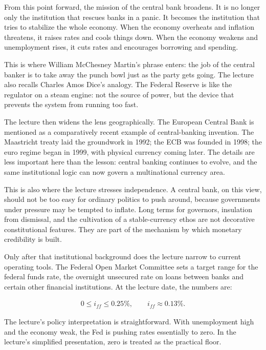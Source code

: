 From this point forward, the mission of the central bank broadens. It is no longer only the institution that rescues banks in a panic. It becomes the institution that tries to stabilize the whole economy. When the economy overheats and inflation threatens, it raises rates and cools things down. When the economy weakens and unemployment rises, it cuts rates and encourages borrowing and spending.

This is where William McChesney Martin's phrase enters: the job of the central banker is to take away the punch bowl just as the party gets going. The lecture also recalls Charles Amos Dice's analogy. The Federal Reserve is like the regulator on a steam engine: not the source of power, but the device that prevents the system from running too fast.

The lecture then widens the lens geographically. The European Central Bank is mentioned as a comparatively recent example of central-banking invention. The Maastricht treaty laid the groundwork in 1992; the ECB was founded in 1998; the euro regime began in 1999, with physical currency coming later. The details are less important here than the lesson: central banking continues to evolve, and the same institutional logic can now govern a multinational currency area.

This is also where the lecture stresses independence. A central bank, on this view, should not be too easy for ordinary politics to push around, because governments under pressure may be tempted to inflate. Long terms for governors, insulation from dismissal, and the cultivation of a stable-currency ethos are not decorative constitutional features. They are part of the mechanism by which monetary credibility is built.

Only after that institutional background does the lecture narrow to current operating tools. The Federal Open Market Committee sets a target range for the federal funds rate, the overnight unsecured rate on loans between banks and certain other financial institutions. At the lecture date, the numbers are:

\begin{align}
0 \le i_{ff} \le 0.25\%, \qquad i_{ff} \approx 0.13\%.
\end{align}

The lecture's policy interpretation is straightforward. With unemployment high and the economy weak, the Fed is pushing rates essentially to zero. In the lecture's simplified presentation, zero is treated as the practical floor.

